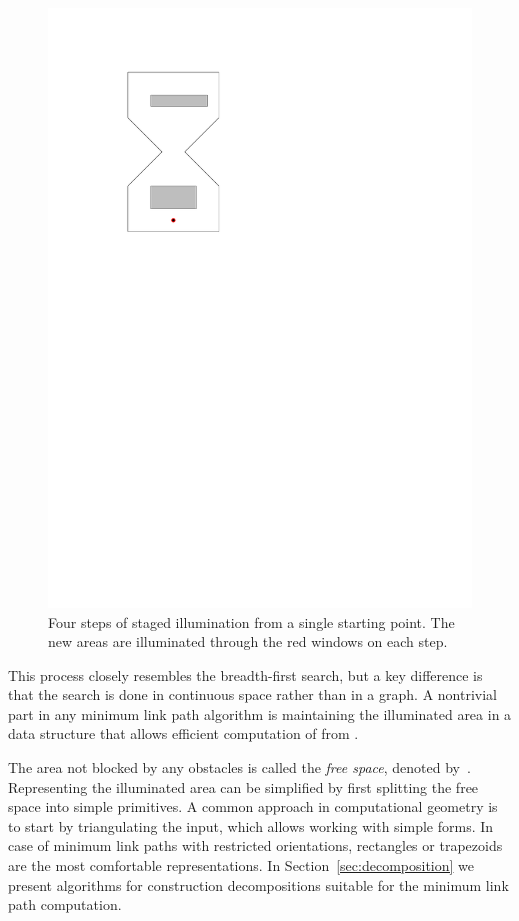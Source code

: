 \documentclass[english,gradu]{tktltiki2018}
\begin{document}
\begin{figure}
	\includegraphics[scale=0.5,page=4]{fig/staged}
	\caption{Four steps of staged illumination from a single starting point. The new areas are illuminated through the red windows on each step.}\label{fig:staged}
\end{figure}

This process closely resembles the breadth-first search, but a key difference is that the search is done in continuous space rather than in a graph.
A nontrivial part in any minimum link path algorithm is maintaining the illuminated area in a data structure that allows efficient computation of  from .

The area not blocked by any obstacles is called the \emph{free space}, denoted by~\fspace.
Representing the illuminated area can be simplified by first splitting the free space into simple primitives.
A common approach in computational geometry is to start by triangulating the input, which allows working with simple forms.
In case of minimum link paths with restricted orientations, rectangles or trapezoids are the most comfortable representations.
In Section~\ref{sec:decomposition} we present algorithms for construction decompositions suitable for the minimum link path computation.
\end{document}
